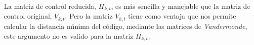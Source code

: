 La matriz de control reducida, $H_{k,t}$, es m\'as sencilla y manejable
que la matriz de control original, $V_{k,t}$. Pero la matriz $V_{k,t}$ tiene
como ventaja que nos permite calcular la distancia m\'{\i}nima del c\'odigo,
mediante las matrices de \emph{Vandermonde}, este argumento no es valido
para la matriz $H_{k,t}$.
